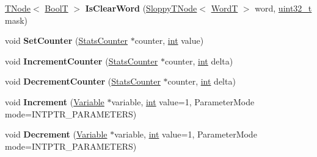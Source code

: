 \begin{DoxyCompactItemize}
\item 
\mbox{\label{classv8_1_1internal_1_1CodeStubAssembler_a04cd109e90d2f68754a55f03f57ccac3}} 
\mbox{\hyperlink{classv8_1_1internal_1_1compiler_1_1TNode}{T\+Node}}$<$ \mbox{\hyperlink{structv8_1_1internal_1_1BoolT}{BoolT}} $>$ {\bfseries Is\+Clear\+Word} (\mbox{\hyperlink{classv8_1_1internal_1_1compiler_1_1SloppyTNode}{Sloppy\+T\+Node}}$<$ \mbox{\hyperlink{structv8_1_1internal_1_1WordT}{WordT}} $>$ word, \mbox{\hyperlink{classuint32__t}{uint32\+\_\+t}} mask)
\item 
\mbox{\label{classv8_1_1internal_1_1CodeStubAssembler_a9ee85113313f423c67aa96d6b320e8a9}} 
void {\bfseries Set\+Counter} (\mbox{\hyperlink{classv8_1_1internal_1_1StatsCounter}{Stats\+Counter}} $\ast$counter, \mbox{\hyperlink{classint}{int}} value)
\item 
\mbox{\label{classv8_1_1internal_1_1CodeStubAssembler_a9d93c3220223ca13a51cfd041e529423}} 
void {\bfseries Increment\+Counter} (\mbox{\hyperlink{classv8_1_1internal_1_1StatsCounter}{Stats\+Counter}} $\ast$counter, \mbox{\hyperlink{classint}{int}} delta)
\item 
\mbox{\label{classv8_1_1internal_1_1CodeStubAssembler_a3f22064ddc62a779133fda610d346a76}} 
void {\bfseries Decrement\+Counter} (\mbox{\hyperlink{classv8_1_1internal_1_1StatsCounter}{Stats\+Counter}} $\ast$counter, \mbox{\hyperlink{classint}{int}} delta)
\item 
\mbox{\label{classv8_1_1internal_1_1CodeStubAssembler_ac334b9bb9460fcd187c1284b3aed0f53}} 
void {\bfseries Increment} (\mbox{\hyperlink{classv8_1_1internal_1_1compiler_1_1CodeAssemblerVariable}{Variable}} $\ast$variable, \mbox{\hyperlink{classint}{int}} value=1, Parameter\+Mode mode=I\+N\+T\+P\+T\+R\+\_\+\+P\+A\+R\+A\+M\+E\+T\+E\+RS)
\item 
\mbox{\label{classv8_1_1internal_1_1CodeStubAssembler_ae842943632499ff30700158a9d109386}} 
void {\bfseries Decrement} (\mbox{\hyperlink{classv8_1_1internal_1_1compiler_1_1CodeAssemblerVariable}{Variable}} $\ast$variable, \mbox{\hyperlink{classint}{int}} value=1, Parameter\+Mode mode=I\+N\+T\+P\+T\+R\+\_\+\+P\+A\+R\+A\+M\+E\+T\+E\+RS)

\end{DoxyCompactItemize}
